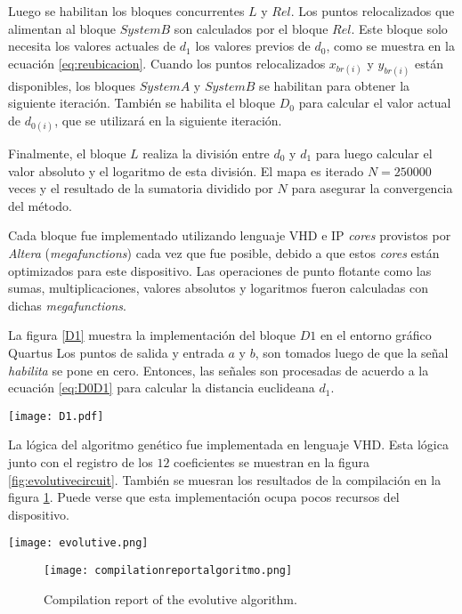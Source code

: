 Luego se habilitan los bloques concurrentes $L$ y $Rel$.
Los puntos relocalizados que alimentan al bloque $System B$ son calculados por el bloque $Rel$.
Este bloque solo necesita los valores actuales de $d_1$ los valores previos de $d_0$, como se muestra en la ecuación \ref{eq:reubicacion}.
Cuando los puntos relocalizados $x_{br(i)}$ y $y_{br(i)}$ están disponibles, los bloques $System A$ y $System B$ se habilitan para obtener la siguiente iteración.
También se habilita el bloque $D_0$ para calcular el valor actual de $d_{0(i)}$, que se utilizará en la siguiente iteración.

Finalmente, el bloque $L$ realiza la división entre $d_0$ y $d_1$ para luego calcular el valor absoluto y el logaritmo de esta división.
El mapa es iterado $N=250000$ veces y el resultado de la sumatoria dividido por $N$ para asegurar la convergencia del método.

Cada bloque fue implementado utilizando lenguaje VHD e IP \textit{cores} provistos por \textit{Altera} (\textit{megafunctions}) cada vez que fue posible, debido a que estos \textit{cores} están optimizados para este dispositivo.
Las operaciones de punto flotante como las sumas, multiplicaciones, valores absolutos y logaritmos fueron calculadas con dichas \textit{megafunctions}.

La figura \ref{D1} muestra la implementación del bloque $D1$ en el entorno gráfico Quartus
Los puntos de salida y entrada $a$ y $b$, son tomados luego de que la señal \textit{habilita} se pone en cero.
Entonces, las señales son procesadas de acuerdo a la ecuación \ref{eq:D0D1} para calcular la distancia euclideana $d_1$.

\begin{figure*}
	\centering
	\texttt{[image: D1.pdf]}\\
	\caption{$D_1$ Block.}\label{D1}
\end{figure*}

La lógica del algoritmo genético fue implementada en lenguaje VHD.
Esta lógica junto con el registro de los $12$ coeficientes se muestran en la figura \ref{fig:evolutivecircuit}.
También se muesran los resultados de la compilación en la figura \ref{fig:alg_comp}.
Puede verse que esta implementación ocupa pocos recursos del dispositivo.

\begin{figure*}
	\centering
	\texttt{[image: evolutive.png]}\\
	\caption{Circuit of the evolutive algorithm.}\label{fig:evolutivecircuit}
\end{figure*}

\begin{figure}
	\centering
	\texttt{[image: compilationreportalgoritmo.png]}\\
	\caption{Compilation report of the evolutive algorithm.}\label{fig:alg_comp}
\end{figure}